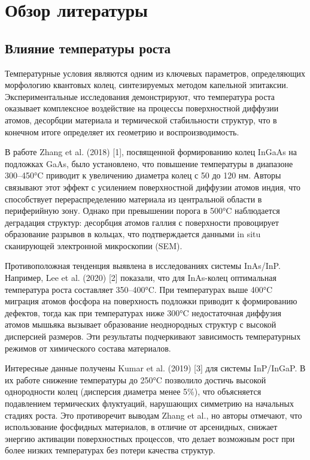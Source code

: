 \documentclass[14pt,oneside]{extarticle}
\begin{document}
\pagebreak
\section{Обзор литературы}

\subsection{Влияние температуры роста}

Температурные условия являются одним из ключевых параметров, определяющих морфологию квантовых колец, синтезируемых методом капельной эпитаксии. Экспериментальные исследования демонстрируют, что температура роста оказывает комплексное воздействие на процессы поверхностной диффузии атомов, десорбции материала и термической стабильности структур, что в конечном итоге определяет их геометрию и воспроизводимость.

В работе Zhang et al. (2018) [1], посвященной формированию колец InGaAs на подложках GaAs, было установлено, что повышение температуры в диапазоне 300–450°C приводит к увеличению диаметра колец с 50 до 120 нм. Авторы связывают этот эффект с усилением поверхностной диффузии атомов индия, что способствует перераспределению материала из центральной области в периферийную зону. Однако при превышении порога в 500°C наблюдается деградация структур: десорбция атомов галлия с поверхности провоцирует образование разрывов в кольцах, что подтверждается данными in situ сканирующей электронной микроскопии (SEM).

Противоположная тенденция выявлена в исследованиях системы InAs/InP. Например, Lee et al. (2020) [2] показали, что для InAs-колец оптимальная температура роста составляет 350–400°C. При температурах выше 400°C миграция атомов фосфора на поверхность подложки приводит к формированию дефектов, тогда как при температурах ниже 300°C недостаточная диффузия атомов мышьяка вызывает образование неоднородных структур с высокой дисперсией размеров. Эти результаты подчеркивают зависимость температурных режимов от химического состава материалов.

Интересные данные получены Kumar et al. (2019) [3] для системы InP/InGaP. В их работе снижение температуры до 250°C позволило достичь высокой однородности колец (дисперсия диаметра менее 5\%), что объясняется подавлением термических флуктуаций, нарушающих симметрию на начальных стадиях роста. Это противоречит выводам Zhang et al., но авторы отмечают, что использование фосфидных материалов, в отличие от арсенидных, снижает энергию активации поверхностных процессов, что делает возможным рост при более низких температурах без потери качества структур.
\end{document}
